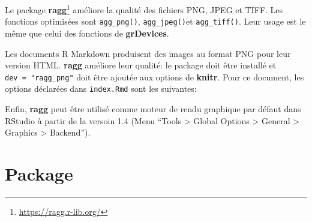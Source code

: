 \documentclass[
  11pt,
  french,
  a4paper,
  extrafontsizes,onecolumn,openright
  ]{memoir}
\newenvironment{Shaded}{\begin{snugshade}}{\end{snugshade}}
\newcommand{\AttributeTok}[1]{\textcolor[rgb]{0.77,0.63,0.00}{#1}}
\newcommand{\ConstantTok}[1]{\textcolor[rgb]{0.00,0.00,0.00}{#1}}
\newcommand{\DecValTok}[1]{\textcolor[rgb]{0.00,0.00,0.81}{#1}}
\newcommand{\FunctionTok}[1]{\textcolor[rgb]{0.00,0.00,0.00}{#1}}
\newcommand{\NormalTok}[1]{#1}
\newcommand{\SpecialCharTok}[1]{\textcolor[rgb]{0.00,0.00,0.00}{#1}}
\newcommand{\StringTok}[1]{\textcolor[rgb]{0.31,0.60,0.02}{#1}}
\begin{document}
Le package \textbf{ragg}\footnote{\url{https://ragg.r-lib.org/}} améliore la qualité des fichiers PNG, JPEG et TIFF.
Les fonctions optimisées sont \texttt{agg\_png()}, \texttt{agg\_jpeg()}et \texttt{agg\_tiff()}. Leur usage est le même que celui des fonctions de \textbf{grDevices}.

Les documents R Markdown produisent des images au format PNG pour leur version HTML.
\textbf{ragg} améliore leur qualité: le package doit être installé et \texttt{dev\ =\ "ragg\_png"} doit être ajoutée aux options de \textbf{knitr}.
Pour ce document, les options déclarées dans \texttt{index.Rmd} sont les suivantes:

\scriptsize

\begin{Shaded}
\end{Shaded}

\normalsize

Enfin, \textbf{ragg} peut être utilisé comme moteur de rendu graphique par défaut dans RStudio à partir de la versoin 1.4 (Menu ``Tools \textgreater{} Global Options \textgreater{} General \textgreater{} Graphics \textgreater{} Backend'').

\hypertarget{chap:package}{%
\chapter{Package}\label{chap:package}}
\end{document}
